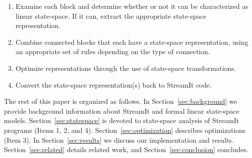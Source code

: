 \begin{enumerate}
\vspace{\itemshrink} \item Examine each block and determine whether or not it can be
characterized as linear state-space. If it can, extract the
appropriate state-space representation.

\vspace{\itemshrink} \item Combine connected blocks that each have a state-space
representation, using an appropriate set of rules depending on the
type of connection.

\vspace{\itemshrink} \item Optimize representations through the use of state-space
transformations.

\vspace{\itemshrink} \item Convert the state-space representation(s) back to StreamIt
code.
\vspace{\itemshrink} \end{enumerate}


The rest of this paper is organized as follows.  In
Section~\ref{sec:background} we provide background information about
StreamIt and formal linear state-space models.
Section~\ref{sec:statespace} is devoted to state-space analysis of
StreamIt programs (Items 1, 2, and 4).
Section~\ref{sec:optimization} describes optimizations (Item 3). In
Section~\ref{sec:results} we discuss our implementation and results.
Section~\ref{sec:related} details related work, and
Section~\ref{sec:conclusion} concludes.
